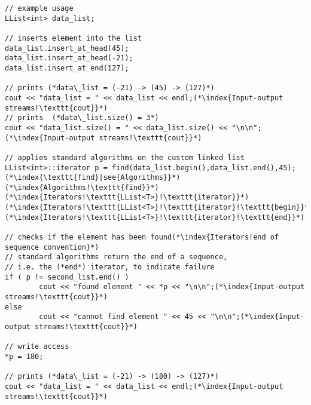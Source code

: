 \documentclass[10pt]{article}
\begin{document}
\begin{lstlisting}
// example usage
LList<int> data_list;

// inserts element into the list
data_list.insert_at_head(45);
data_list.insert_at_head(-21);
data_list.insert_at_end(127);

// prints (*data\_list = (-21) -> (45) -> (127)*)
cout << "data_list = " << data_list << endl;(*\index{Input-output streams!\texttt{cout}}*)
// prints  (*data\_list.size() = 3*)
cout << "data_list.size() = " << data_list.size() << "\n\n";(*\index{Input-output streams!\texttt{cout}}*)

// applies standard algorithms on the custom linked list
LList<int>::iterator p = find(data_list.begin(),data_list.end(),45);(*\index{\texttt{find}|see{Algorithms}}*)(*\index{Algorithms!\texttt{find}}*)(*\index{Iterators!\texttt{LList<T>}!\texttt{iterator}}*)(*\index{Iterators!\texttt{LList<T>}!\texttt{iterator}!\texttt{begin}}*)(*\index{Iterators!\texttt{LList<T>}!\texttt{iterator}!\texttt{end}}*)

// checks if the element has been found(*\index{Iterators!end of sequence convention}*)
// standard algorithms return the end of a sequence, 
// i.e. the (*end*) iterator, to indicate failure
if ( p != second_list.end() )
        cout << "found element " << *p << "\n\n";(*\index{Input-output streams!\texttt{cout}}*)
else
        cout << "cannot find element " << 45 << "\n\n";(*\index{Input-output streams!\texttt{cout}}*)

// write access
*p = 180;

// prints (*data\_list = (-21) -> (180) -> (127)*)
cout << "data_list = " << data_list << endl;(*\index{Input-output streams!\texttt{cout}}*)
\end{lstlisting}
%
%
\end{document}
